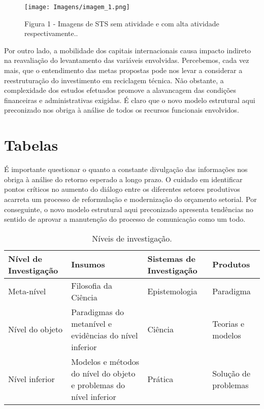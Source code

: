 \begin{figure}[!htb]
	\caption{Figura 1 - Imagens de STS sem atividade e com alta atividade respectivamente..
}
  \centering
  \texttt{[image: Imagens/imagem\_1.png]} 
  
  \label{figura0}
\end{figure}

Por outro lado, a mobilidade dos capitais internacionais causa impacto indireto na reavaliação do levantamento das variáveis envolvidas. Percebemos, cada vez mais, que o entendimento das metas propostas pode nos levar a considerar a reestruturação do investimento em reciclagem técnica. Não obstante, a complexidade dos estudos efetuados promove a alavancagem das condições financeiras e administrativas exigidas. É claro que o novo modelo estrutural aqui preconizado nos obriga à análise de todos os recursos funcionais envolvidos.

\section{Tabelas}

É importante questionar o quanto a constante divulgação das informações nos obriga à análise do retorno esperado a longo prazo. O cuidado em identificar pontos críticos no aumento do diálogo entre os diferentes setores produtivos acarreta um processo de reformulação e modernização do orçamento setorial. Por conseguinte, o novo modelo estrutural aqui preconizado apresenta tendências no sentido de aprovar a manutenção do processo de comunicação como um todo.

\begin{table}[htb]
\ABNTEXfontereduzida
\caption[Níveis de investigação]{Níveis de investigação.}
\label{tab-nivinv}
\begin{tabular}{p{2.6cm}|p{6.0cm}|p{2.25cm}|p{3.40cm}}
   \textbf{Nível de Investigação} & \textbf{Insumos}  & \textbf{Sistemas de Investigação}  & \textbf{Produtos}  \\
    \hline
    Meta-nível & Filosofia\index{filosofia} da Ciência  & Epistemologia &
    Paradigma  \\
    \hline
    Nível do objeto & Paradigmas do metanível e evidências do nível inferior &
    Ciência  & Teorias e modelos \\
    \hline
    Nível inferior & Modelos e métodos do nível do objeto e problemas do nível inferior & Prática & Solução de problemas  \\
\end{tabular}
\end{table}


